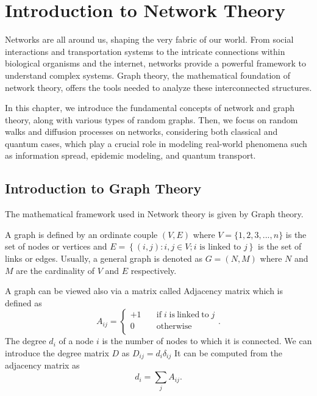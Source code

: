 \chapter{Introduction to Network Theory}\label{Network_Theory}

Networks are all around us, shaping the very fabric of our world. From social interactions and transportation systems to the intricate connections within biological organisms and the internet, networks provide a powerful framework to understand complex systems. Graph theory, the mathematical foundation of network theory, offers the tools needed to analyze these interconnected structures.

In this chapter, we introduce the fundamental concepts of network and graph theory, along with various types of random graphs.
Then, we focus on random walks and diffusion processes on networks, considering both classical and quantum cases, which play a crucial role in modeling real-world phenomena such as information spread, epidemic modeling, and quantum transport.


\section{Introduction to Graph Theory}

The mathematical framework used in Network theory is given by Graph theory. 

A graph is defined by an ordinate couple $(V,E)$ where $V = \{1,2,3, ...,n\}$ is the set of nodes or vertices and $E = \left\{ (i, j): i , j \in V ; i \text{ is linked to } j\right\}$ is the set of links or edges. Usually, a general graph is denoted as $G =(N,M)$ where $N$ and $M$ are the cardinality of $V$ and $E$ respectively.

A graph can be viewed also via a matrix called Adjacency matrix which is defined as
\begin{equation}
    A_{ij}= \left\{ \begin{aligned}
        +1 &\quad \mathrm{if} \; i \; \mathrm{is ~linked ~to} \; j \\
        0 &\quad \mathrm{otherwise} \\
    \end{aligned} \right.  .
\end{equation}
The degree $d_i$ of a node $i$ is the number of nodes to which it is connected. We can introduce the degree matrix $D$ as $D_{ij} = d_i\delta_{ij}$
It can be computed from the adjacency matrix as
\begin{equation}
    d_i = \sum_j A_{ij}.
\end{equation}

